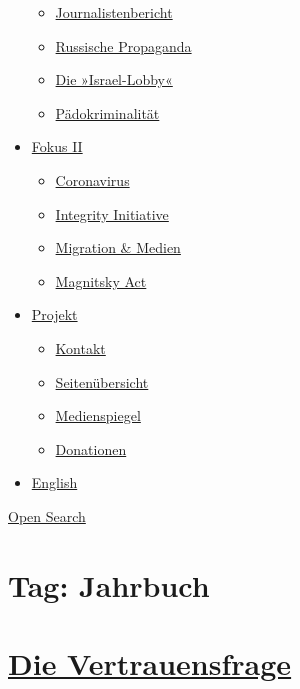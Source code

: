 \begin{itemize}
  \begin{itemize}
  \tightlist
  \item
    \href{https://swprs.org/bericht-eines-journalisten/}{Journalistenbericht}
  \item
    \href{https://swprs.org/russische-propaganda/}{Russische Propaganda}
  \item
    \href{https://swprs.org/die-israel-lobby-fakten-und-mythen/}{Die
    »Israel-Lobby«}
  \item
    \href{https://swprs.org/geopolitik-und-paedokriminalitaet/}{Pädokriminalität}
  \end{itemize}
\item
  \href{https://swprs.org/migration-und-medien/}{Fokus II}

  \begin{itemize}
  \tightlist
  \item
    \href{https://swprs.org/covid-19-hinweis-ii/}{Coronavirus}
  \item
    \href{https://swprs.org/die-integrity-initiative/}{Integrity
    Initiative}
  \item
    \href{https://swprs.org/migration-und-medien/}{Migration \& Medien}
  \item
    \href{https://swprs.org/der-fall-magnitsky/}{Magnitsky Act}
  \end{itemize}
\item
  \href{https://swprs.org/kontakt/}{Projekt}

  \begin{itemize}
  \tightlist
  \item
    \href{https://swprs.org/kontakt/}{Kontakt}
  \item
    \href{https://swprs.org/uebersicht/}{Seitenübersicht}
  \item
    \href{https://swprs.org/medienspiegel/}{Medienspiegel}
  \item
    \href{https://swprs.org/donationen/}{Donationen}
  \end{itemize}
\item
  \href{https://swprs.org/contact/}{English}
\end{itemize}

\protect\hyperlink{}{Open Search}

\hypertarget{tag-jahrbuch}{%
\section{Tag: Jahrbuch}\label{tag-jahrbuch}}

\hypertarget{die-vertrauensfrage}{%
\section{\texorpdfstring{\href{https://swprs.org/2017/03/01/schweizer-medien-vertrauen/}{Die
Vertrauensfrage}}{Die Vertrauensfrage}}\label{die-vertrauensfrage}}

